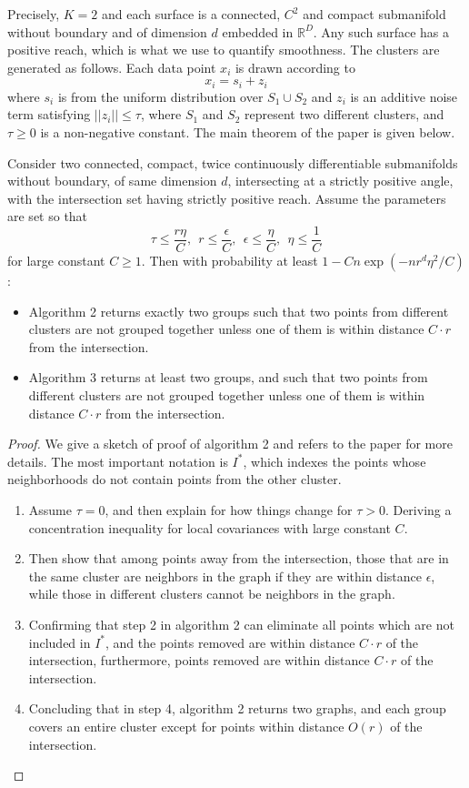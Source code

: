 \documentclass[twoside,11pt]{article}
\begin{document}
Precisely, $K=2$ and each surface is a connected, $C^2$ and compact submanifold without boundary and of dimension $d$ embedded in $\mathbb R^D$.
Any such surface has a positive reach, which is what we use to quantify smoothness.
The clusters are generated as follows.
Each data point $x_i$ is drawn according to
$$ x_i = s_i + z_i $$
where $s_i$ is from the uniform distribution over
$S_1\cup S_2$ and $z_i$
is an additive noise term satisfying $||z_i||\le \tau$, where \(S_1\) and \(S_2\) represent two different clusters, and \(\tau\geq0\) is a non-negative constant.
The main theorem of the paper is given below.
\begin{theorem}
Consider two connected, compact, twice continuously differentiable submanifolds
without boundary, of same dimension \(d\), intersecting at a strictly positive angle, with the intersection set having strictly positive reach.
Assume the parameters are set so that
$$
\tau\le \frac{r\eta}{C},\ \ r\le\frac{\epsilon}{C},\ \ \epsilon\le\frac{\eta}{C},\ \ \eta\le\frac{1}{C}
$$
for large constant $C\ge 1$.
Then with probability at least $1-Cn\exp(- nr^d\eta^2/C)$:
\begin{itemize}
\item Algorithm 2 returns exactly two groups such that two points from different clusters are not grouped together unless one of them is within distance \(C\cdot r\) from the intersection.
\item Algorithm 3 returns at least two groups, and such that two points from different clusters are not grouped together unless one of them is within distance \(C\cdot r\) from the intersection.
\end{itemize}
\end{theorem}

\begin{proof}
We give a sketch of proof of algorithm 2 and refers to the paper for more details.
The most important notation is $I^*$, which indexes the points whose neighborhoods do not contain points from the other cluster.

\begin{enumerate}
\item Assume $\tau=0$, and then explain for how things change for $\tau>0$. Deriving a concentration inequality for local covariances with large constant $C$.
\item Then show that among points away from the intersection, those that are in the same cluster are neighbors in the graph if they are within distance $\epsilon$, while those in different clusters cannot be neighbors in the graph.
\item Confirming that step 2 in algorithm 2 can eliminate all points which are not included in $I^*$, and  the points removed are within distance \(C\cdot r\) of the intersection, furthermore,  points removed are within distance \(C\cdot r\) of the intersection.
\item Concluding that in step 4, algorithm 2 returns two graphs, and each group covers an entire cluster except for points within distance $O(r)$ of the intersection.
\end{enumerate}
\end{proof}
\end{document}
